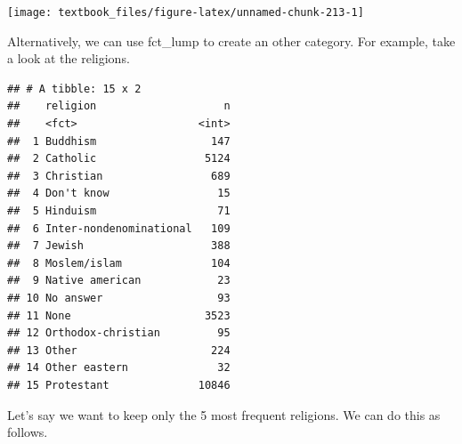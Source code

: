 \documentclass[]{tufte-book}
\newenvironment{Shaded}{}{}
\newcommand{\DataTypeTok}[1]{\textcolor[rgb]{0.56,0.13,0.00}{#1}}
\newcommand{\DecValTok}[1]{\textcolor[rgb]{0.25,0.63,0.44}{#1}}
\newcommand{\KeywordTok}[1]{\textcolor[rgb]{0.00,0.44,0.13}{\textbf{#1}}}
\newcommand{\NormalTok}[1]{#1}
\newcommand{\OperatorTok}[1]{\textcolor[rgb]{0.40,0.40,0.40}{#1}}
\newcommand{\StringTok}[1]{\textcolor[rgb]{0.25,0.44,0.63}{#1}}
\begin{document}
\begin{Shaded}
\end{Shaded}

\texttt{[image: textbook\_files/figure-latex/unnamed-chunk-213-1]}

Alternatively, we can use fct\_lump to create an other category. For example, take a look at the religions.

\begin{Shaded}
\end{Shaded}

\begin{verbatim}
## # A tibble: 15 x 2
##    religion                    n
##    <fct>                   <int>
##  1 Buddhism                  147
##  2 Catholic                 5124
##  3 Christian                 689
##  4 Don't know                 15
##  5 Hinduism                   71
##  6 Inter-nondenominational   109
##  7 Jewish                    388
##  8 Moslem/islam              104
##  9 Native american            23
## 10 No answer                  93
## 11 None                     3523
## 12 Orthodox-christian         95
## 13 Other                     224
## 14 Other eastern              32
## 15 Protestant              10846
\end{verbatim}

Let's say we want to keep only the 5 most frequent religions. We can do this as follows.

\begin{Shaded}
\end{Shaded}
\end{document}
